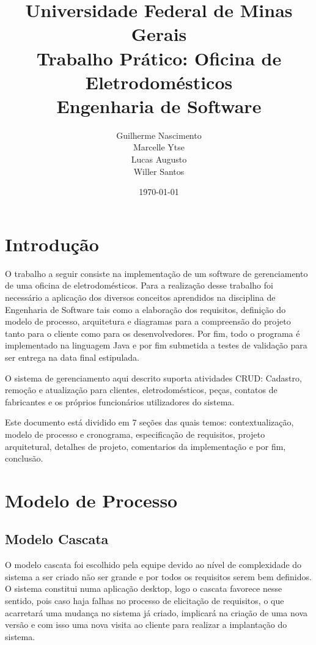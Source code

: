 \documentclass[a4paper,10pt]{article}
\begin{document}
\title{\textbf{Universidade Federal de Minas Gerais}\\
		Trabalho Prático: Oficina de Eletrodomésticos\\
		Engenharia de Software}

\author{Guilherme Nascimento\\
	Marcelle Ytse\\
	Lucas Augusto\\
	Willer Santos\\
}
	
\date{\today}  %
\maketitle


\section{Introdução }
O trabalho a seguir consiste na implementação de um software de gerenciamento de uma oficina de eletrodomésticos. Para a realização desse trabalho foi necessário a aplicação dos diversos conceitos aprendidos na disciplina de Engenharia de Software tais como a elaboração dos requisitos, definição do modelo de processo, arquitetura e diagramas para a compreensão do projeto tanto para o cliente como para os desenvolvedores. Por fim, todo o programa é implementado na linguagem Java e por fim submetida a testes de validação para ser entrega na data final estipulada.

O sistema de gerenciamento aqui descrito suporta atividades CRUD: Cadastro, remoção e atualização para clientes, eletrodomésticos, peças, contatos de fabricantes e os próprios funcionários utilizadores do sistema.

Este documento está dividido em 7 seções das quais temos: contextualização, modelo de processo e cronograma, especificação de requisitos, projeto arquitetural, detalhes de projeto, comentarios da implementação e por fim, conclusão.


\section{Modelo de Processo}
\subsection{Modelo Cascata}

O modelo cascata foi escolhido pela equipe devido ao nível de complexidade do sistema a ser criado não ser grande e por todos os requisitos serem bem definidos. O sistema constitui numa aplicação desktop, logo o cascata favorece nesse sentido, pois caso haja falhas no processo de elicitação de requisitos, o que acarretará uma mudança no sistema já criado, implicará na criação de uma nova versão e com isso uma nova visita ao cliente para realizar a implantação do sistema. 
\end{document}
